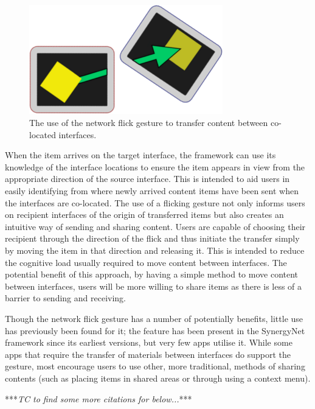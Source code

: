 \documentclass[a4paper,11pt]{article}
\begin{document}
\begin{figure}[h]
 \centering
   \includegraphics[width=0.75\textwidth]{figures/flickexample.png}
   \caption{The use of the network flick gesture to transfer content between co-located interfaces.}
   \label{fig:FlickExample}
\end{figure}

When the item arrives on the target interface, the framework can use its knowledge of the interface locations to ensure the item appears in view from the appropriate direction of the source interface.
This is intended to aid users in easily identifying from where newly arrived content items have been sent when the interfaces are co-located.
The use of a flicking gesture not only informs users on recipient interfaces of the origin of transferred items but also creates an intuitive way of sending and sharing content.
Users are capable of choosing their recipient through the direction of the flick and thus initiate the transfer simply by moving the item in that direction and releasing it.
This is intended to reduce the cognitive load usually required to move content between interfaces.
The potential benefit of this approach, by having a simple method to move content between interfaces, users will be more willing to share items as there is less of a barrier to sending and receiving.

Though the network flick gesture has a number of potentially benefits, little use has previously been found for it; the feature has been present in the SynergyNet framework since its earliest versions, but very few apps utilise it.
While some apps that require the transfer of materials between interfaces do support the gesture, most encourage users to use other, more traditional, methods of sharing contents (such as placing items in shared areas or through using a context menu).

***{\emph{TC to find some more citations for below...}}***
\end{document}

